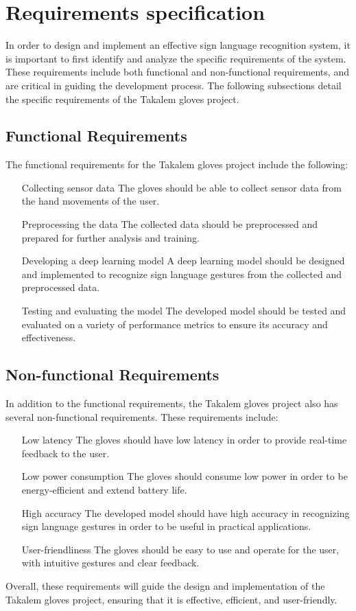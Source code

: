 \section{Requirements specification}
In order to design and implement an effective sign language recognition system, it is important to first identify and analyze the specific requirements of the system. These requirements include both functional and non-functional requirements, and are critical in guiding the development process. The following subsections detail the specific requirements of the Takalem gloves project.

\subsection{Functional Requirements}
The functional requirements for the Takalem gloves project include the following:

\begin{enumerate}
	\item[Collecting sensor data] The gloves should be able to collect sensor data from the hand movements of the user.
	\item[Preprocessing the data] The collected data should be preprocessed and prepared for further analysis and training.
	\item[Developing a deep learning model] A deep learning model should be designed and implemented to recognize sign language gestures from the collected and preprocessed data.
	\item[Testing and evaluating the model] The developed model should be tested and evaluated on a variety of performance metrics to ensure its accuracy and effectiveness.
\end{enumerate}
\subsection{Non-functional Requirements}
In addition to the functional requirements, the Takalem gloves project also has several non-functional requirements. These requirements include:

\begin{enumerate}
	\item[Low latency] The gloves should have low latency in order to provide real-time feedback to the user.
	\item[Low power consumption] The gloves should consume low power in order to be energy-efficient and extend battery life.
	\item[High accuracy] The developed model should have high accuracy in recognizing sign language gestures in order to be useful in practical applications.
	\item[User-friendliness] The gloves should be easy to use and operate for the user, with intuitive gestures and clear feedback.
\end{enumerate}
Overall, these requirements will guide the design and implementation of the Takalem gloves project, ensuring that it is effective, efficient, and user-friendly.